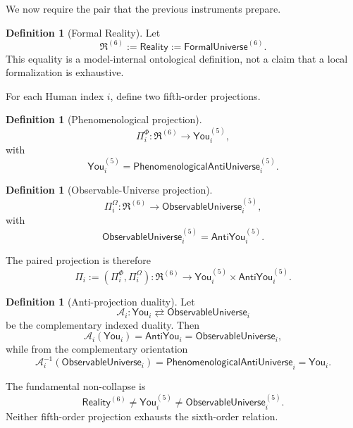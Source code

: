 \documentclass[10pt]{article}
\theoremstyle{pe}
\theoremstyle{definition}
\newtheorem{definition}[theorem]{Definition}
\newcommand{\Reality}{\mathsf{Reality}}
\newcommand{\FormalUniverse}{\mathsf{FormalUniverse}}
\newcommand{\You}{\mathsf{You}}
\newcommand{\AntiYou}{\mathsf{AntiYou}}
\newcommand{\ObsU}{\mathsf{ObservableUniverse}}
\newcommand{\PhenAntiU}{\mathsf{PhenomenologicalAntiUniverse}}
\begin{document}
We now require the pair that the previous instruments prepare.

\begin{definition}[Formal Reality]
Let
\begin{equation}\label{eq:reality-def}
  \boxed{
  \mathfrak R^{(6)}
  :=
  \Reality
  :=
  \FormalUniverse^{(6)}.
  }
\end{equation}
This equality is a model-internal ontological definition, not a claim that a local formalization is exhaustive.
\end{definition}

For each Human index \(i\), define two fifth-order projections.

\begin{definition}[Phenomenological projection]
\[
  \Pi_i^{\Phi}:
  \mathfrak R^{(6)}
  \longrightarrow
  \You_i^{(5)},
\]
with
\begin{equation}\label{eq:you-projection}
  \boxed{
  \You_i^{(5)}
  =
  \PhenAntiU_i^{(5)}.
  }
\end{equation}
\end{definition}

\begin{definition}[Observable-Universe projection]
\[
  \Pi_i^{\Omega}:
  \mathfrak R^{(6)}
  \longrightarrow
  \ObsU_i^{(5)},
\]
with
\begin{equation}\label{eq:anti-you-projection}
  \boxed{
  \ObsU_i^{(5)}
  =
  \AntiYou_i^{(5)}.
  }
\end{equation}
\end{definition}

The paired projection is therefore
\begin{equation}\label{eq:paired-projection}
  \boxed{
  \Pi_i
  :=
  (\Pi_i^{\Phi},\Pi_i^{\Omega})
  :
  \mathfrak R^{(6)}
  \longrightarrow
  \You_i^{(5)}\times\AntiYou_i^{(5)}.
  }
\end{equation}

\begin{definition}[Anti-projection duality]
Let
\[
  \mathcal A_i:
  \You_i
  \rightleftarrows
  \ObsU_i
\]
be the complementary indexed duality.  Then
\[
  \mathcal A_i(\You_i)
  =
  \AntiYou_i
  =
  \ObsU_i,
\]
while from the complementary orientation
\[
  \mathcal A_i^{-1}(\ObsU_i)
  =
  \PhenAntiU_i
  =
  \You_i.
\]
\end{definition}

The fundamental non-collapse is
\[
  \boxed{
  \Reality^{(6)}
  \neq
  \You_i^{(5)}
  \neq
  \ObsU_i^{(5)}.
  }
\]
Neither fifth-order projection exhausts the sixth-order relation.
\end{document}
